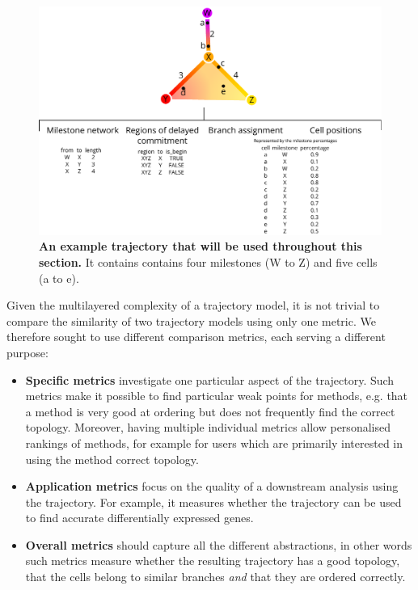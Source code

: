 \begin{figure}[tbh!]
	\centering\includegraphics[width=\linewidth]{fig/snote1fig_1.pdf}
	\caption{
		\textbf{An example trajectory that will be used throughout this section.}
		It contains contains four milestones (W to Z) and five cells (a to e).
	}
	\label{fig:snote1fig_1}
\end{figure}

Given the multilayered complexity of a trajectory model, it is not trivial to compare the similarity of two trajectory models using only one metric. We therefore sought to use different comparison metrics, each serving a different purpose:

\begin{itemize}
	\item \textbf{Specific metrics} investigate one particular aspect of the trajectory. Such metrics make it possible to find particular weak points for methods, e.g. that a method is very good at ordering but does not frequently find the correct topology. Moreover, having multiple individual metrics allow personalised rankings of methods, for example for users which are primarily interested in using the method correct topology.
	\item \textbf{Application metrics} focus on the quality of a downstream analysis using the trajectory. For example, it measures whether the trajectory can be used to find accurate differentially expressed genes.
	\item \textbf{Overall metrics} should capture all the different abstractions, in other words such metrics measure whether the resulting trajectory has a good topology, that the cells belong to similar branches \textit{and} that they are ordered correctly.
\end{itemize}

